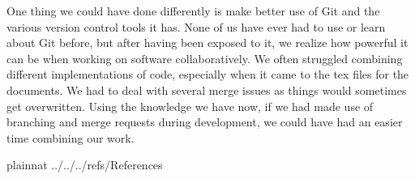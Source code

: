 \documentclass[12pt, titlepage]{article}
\begin{document}
\noindent One thing we could have done differently is make better use of Git and the various version control tools it has. None of us have ever had to use or learn about Git before, but after having been exposed to it, we realize how powerful it can be when working on software collaboratively. We often struggled combining different implementations of code, especially when it came to the tex files for the documents. We had to deal with several merge issues as things would sometimes get overwritten. Using the knowledge we have now, if we had made use of branching and merge requests during development, we could have had an easier time combining our work.\\

\newpage

 {plainnat}
 {../../../refs/References}
\end{document}
